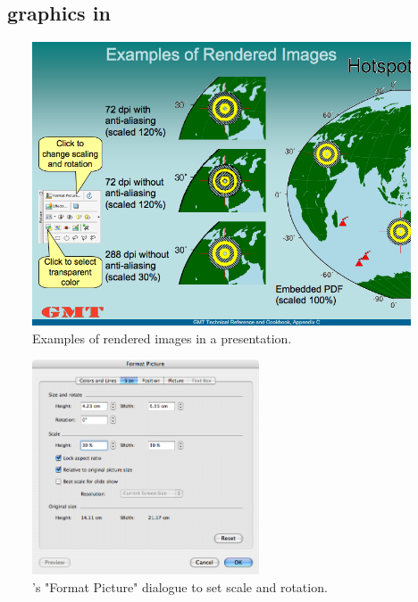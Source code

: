 \subsection{\gmt\ graphics in }
\begin{figure}[b]
   \includegraphics[width=\textwidth,bb=0 0 720 540]{ppt/rendering.png}
   \caption{Examples of rendered images in a  presentation.}
   \label{fig:rendering}
\end{figure}
\begin{figure}[b]
   \centering
   \includegraphics[width=0.6\textwidth,bb=0 0 545 516]{ppt/formatpicture.png}
   \caption{'s "Format Picture" dialogue to set scale and rotation.}
   \label{fig:formatpicture}
\end{figure}

